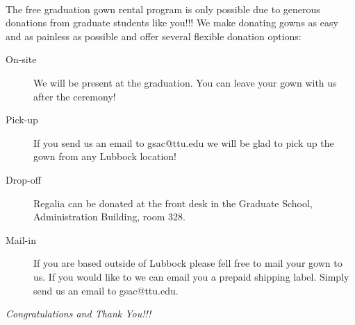 \documentclass{tufte-handout}
\begin{document}
~\\
\noindent The free graduation gown rental program is only possible due to generous donations from graduate students like you!!! We make donating gowns as easy and as painless as possible and offer several flexible donation options:

\begin{description}
\item[On-site] We will be present at the graduation. You can leave your  gown with us after the ceremony!
\item[Pick-up] If you send us an email to gsac@ttu.edu we will be glad to pick up the gown from any Lubbock location!
\item[Drop-off] Regalia can be donated at the front desk in the Graduate School, Administration Building, room 328.
\item[Mail-in] If you are based outside of Lubbock please fell free to mail your gown to us. If you would like to we can email you a prepaid shipping label. Simply send us an email to gsac@ttu.edu.
\end{description}

\begin{fullwidth}
\Huge{\textit{Congratulations and Thank You!!!}}
\end{fullwidth}
\end{document}
